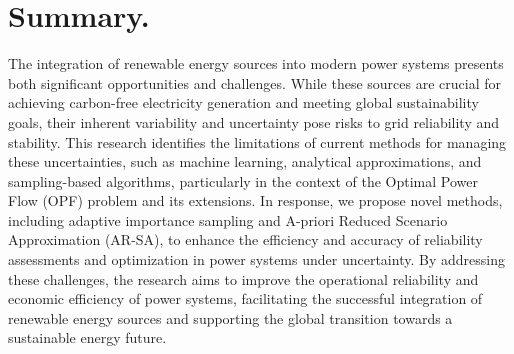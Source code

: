 \section{Summary.}
The integration of renewable energy sources into modern power systems presents both significant opportunities and challenges. While these sources are crucial for achieving carbon-free electricity generation and meeting global sustainability goals, their inherent variability and uncertainty pose risks to grid reliability and stability. This research identifies the limitations of current methods for managing these uncertainties, such as machine learning, analytical approximations, and sampling-based algorithms, particularly in the context of the Optimal Power Flow (OPF) problem and its extensions. In response, we propose novel methods, including adaptive importance sampling and A-priori Reduced Scenario Approximation (AR-SA), to enhance the efficiency and accuracy of reliability assessments and optimization in power systems under uncertainty. By addressing these challenges, the research aims to improve the operational reliability and economic efficiency of power systems, facilitating the successful integration of renewable energy sources and supporting the global transition towards a sustainable energy future.



